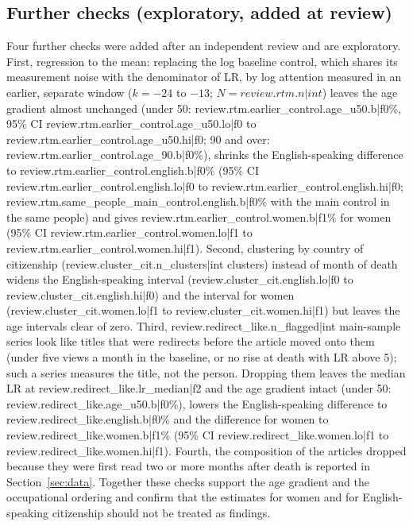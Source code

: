 \documentclass[11pt,a4paper]{article}
\begin{document}
\subsection{Further checks (exploratory, added at review)}
Four further checks were added after an independent review and are exploratory. First, regression to the mean: replacing the log baseline control, which shares its measurement noise with the denominator of LR, by log attention measured in an earlier, separate window ($k = -24$ to $-13$; $N = {{review.rtm.n|int}}$) leaves the age gradient almost unchanged (under 50: {{review.rtm.earlier_control.age_u50.b|f0}}\%, 95\% CI {{review.rtm.earlier_control.age_u50.lo|f0}} to {{review.rtm.earlier_control.age_u50.hi|f0}}; 90 and over: {{review.rtm.earlier_control.age_90.b|f0}}\%), shrinks the English-speaking difference to {{review.rtm.earlier_control.english.b|f0}}\% (95\% CI {{review.rtm.earlier_control.english.lo|f0}} to {{review.rtm.earlier_control.english.hi|f0}}; {{review.rtm.same_people_main_control.english.b|f0}}\% with the main control in the same people) and gives {{review.rtm.earlier_control.women.b|f1}}\% for women (95\% CI {{review.rtm.earlier_control.women.lo|f1}} to {{review.rtm.earlier_control.women.hi|f1}}). Second, clustering by country of citizenship ({{review.cluster_cit.n_clusters|int}} clusters) instead of month of death widens the English-speaking interval ({{review.cluster_cit.english.lo|f0}} to {{review.cluster_cit.english.hi|f0}}) and the interval for women ({{review.cluster_cit.women.lo|f1}} to {{review.cluster_cit.women.hi|f1}}) but leaves the age intervals clear of zero. Third, {{review.redirect_like.n_flagged|int}} main-sample series look like titles that were redirects before the article moved onto them (under five views a month in the baseline, or no rise at death with LR above 5); such a series measures the title, not the person. Dropping them leaves the median LR at {{review.redirect_like.lr_median|f2}} and the age gradient intact (under 50: {{review.redirect_like.age_u50.b|f0}}\%), lowers the English-speaking difference to {{review.redirect_like.english.b|f0}}\% and the difference for women to {{review.redirect_like.women.b|f1}}\% (95\% CI {{review.redirect_like.women.lo|f1}} to {{review.redirect_like.women.hi|f1}}). Fourth, the composition of the articles dropped because they were first read two or more months after death is reported in Section~\ref{sec:data}. Together these checks support the age gradient and the occupational ordering and confirm that the estimates for women and for English-speaking citizenship should not be treated as findings.
\end{document}
